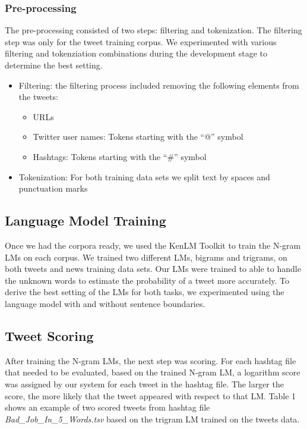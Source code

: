 \documentclass[11pt,a4paper]{article}
\begin{document}
\subsubsection{Pre-processing}
The pre-processing consisted of two steps: filtering and tokenization. The filtering step was only for the tweet training corpus. We experimented with various filtering and tokenziation combinations during the development stage to determine the best setting. 
\begin{itemize}
\item Filtering: the filtering process included removing the following elements from the tweets:
\begin{itemize}
\item URLs
\item Twitter user names: Tokens starting with the ``@'' symbol 
\item Hashtags: Tokens starting with the ``\#'' symbol 
\end{itemize}
\item Tokenization: For both training data sets we split text by spaces and punctuation marks
\end{itemize}

\subsection{Language Model Training}
Once we had the corpora ready, we used the KenLM Toolkit to train the N-gram LMs on each corpus. We trained two different LMs, bigrams and trigrams, on both tweets and news training data sets. Our LMs were trained to able to handle the unknown words to estimate the probability of a tweet more accurately. To derive the best setting of the LMs for both tasks, we experimented using the language model with and without sentence boundaries.

\subsection{Tweet Scoring}
After training the N-gram LMs, the next step was scoring. For each hashtag file that needed to be evaluated, based on the trained N-gram LM, a logarithm score was assigned by our system for each tweet in the hashtag file. The larger the score, the more likely that the tweet appeared with respect to that LM. Table 1 shows an example of two scored tweets from hashtag file \textit{Bad\_Job\_In\_5\_Words.tsv} based on the trigram LM trained on the tweets data.
\end{document}
